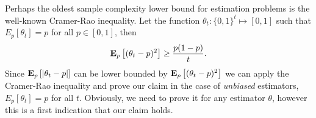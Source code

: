 Perhaps the oldest sample complexity lower bound for estimation problems
is the well-known Cramer-Rao inequality.
Let the function $\theta_t: \{0,1\}^t \mapsto [0,1]$ such that $E_p[\theta_t]=p$ for
all $p \in [0,1]$, then
\begin{equation}\label{eq:crlb}
  \bm{\mathrm{E}}_{p} \left[ (\theta_t - p)^2 \right] \geq \frac{p(1-p)}{t}.
\end{equation}
Since $\bm{\mathrm{E}}_{p} \left[ |\theta_t - p| \right]$ can be lower bounded
by $\bm{\mathrm{E}}_{p} \left[ (\theta_t - p)^2 \right]$ we can apply the Cramer-Rao inequality and
prove our claim in the case of \emph{unbiased} estimators, $E_p[\theta_t]=p$
for all $t$. Obviously, we need to prove it for any estimator $\theta$, however
this is a first indication that our claim holds.

